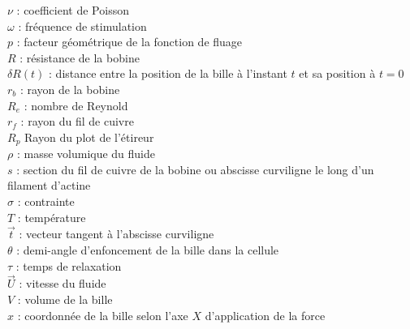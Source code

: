 $\nu$ : coefficient de Poisson\\
$\omega$ : fréquence de stimulation\\ 
$p$ : facteur géométrique de la fonction de fluage\\
$R$ : résistance de la bobine\\
$\delta R(t)$ : distance entre la position de la bille à l'instant $t$ et sa position à $t=0$\\
$r_b$ : rayon de la bobine\\
$R_e$ : nombre de Reynold\\
$r_f$ : rayon du fil de cuivre\\
$R_p$ Rayon du plot de l'étireur\\
$\rho$ : masse volumique du fluide\\
$s$ : section du fil de cuivre de la bobine ou abscisse curviligne le long d'un filament d'actine\\
$\sigma$ : contrainte\\
$T$ : température\\
$\vec{t}$ : vecteur tangent à l'abscisse curviligne\\
$\theta$ : demi-angle d'enfoncement de la bille dans la cellule\\
$\tau$ : temps de relaxation \\
$\vec{U}$ : vitesse du fluide\\
$V$ : volume de la bille\\
$x$ : coordonnée de la bille selon l'axe $X$ d'application de la force\\
